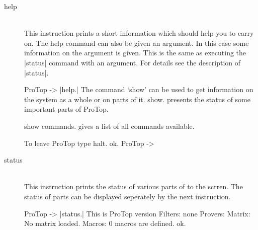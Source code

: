 \begin{description}
  \item [help]\ 
    \\
    This instruction prints a short information which should help you to carry
    on. The help command can also be given an argument. In this case some
    information on the argument is given. This is the same as executing the
    |status| command with an argument. For details see the description of
    |status|.
\begin{BoxedSample}
  ProTop -> |help.|
  The command `show' can be used to get information on the
  system as a whole or on parts of it.
    show.
  presents the status of some important parts of ProTop.

    show commands.
  gives a list of all commands available.

  To leave ProTop type
    halt.
  ok.
  ProTop ->
\end{BoxedSample}

  \item [status]\ 
    \\
    This instruction prints the status of various parts of \ProTop{} to the
    scrren. The status of parts can be displayed seperately by the next
    instruction.
\begin{BoxedSample}\def\Prover#1{          #1\par}\let\Filter\Prover
  ProTop -> |status.|
    This is ProTop version \Version
    Filters:
\ProTopFilters
          none
    Provers:
\ProTopProvers
    Matrix:
          No matrix loaded.
    Macros:
          0 macros are defined.
  ok.
\end{BoxedSample}


\end{description}
